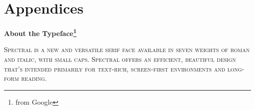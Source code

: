 \setcounter{section}{1}



\mainmatter
\renewcommand{\thefootnote}{\arabic{footnote}}











\part*{Appendices}
\appendix


\newpage
\backmatter

\titleformat{\chapter}[hang]{\Large}{\filright\enspace\thechapter\enspace}{2.5cm}{\Large\bfseries\filcenter}
\printbibliography

\newpage
{}
\vspace*{0.15\paperheight}
\begin{center}\bfseries
About the Typeface\footnote{from Google}
\end{center}
\noindent\hfil\parbox[c][1.1\height][c]{0.5\textwidth}{\small\scshape
Spectral is a new and versatile serif face available in seven weights of roman and italic, with small caps.
Spectral offers an efficient, beautiful design that’s intended primarily for text-rich, screen-first environments and long-form reading.}
\vspace*{\fill}

